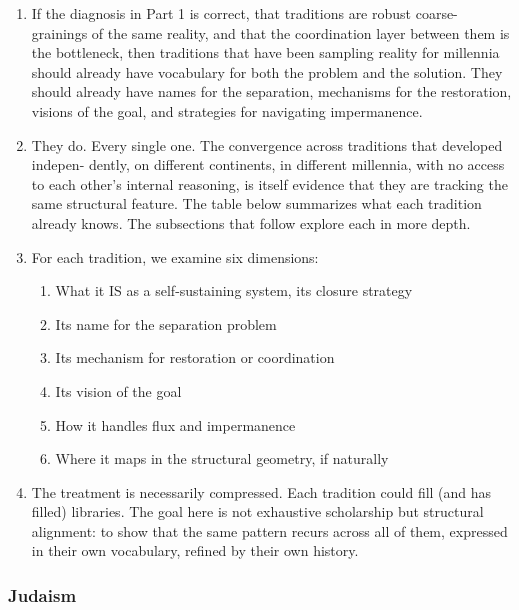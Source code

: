 \documentclass[
]{article}
\providecommand{\tightlist}{%
  \setlength{\itemsep}{0pt}\setlength{\parskip}{0pt}}
\begin{document}
\begin{enumerate}
\def\labelenumi{\arabic{enumi}.}
\setcounter{enumi}{12}
\tightlist
\item
  If the diagnosis in Part 1 is correct, that traditions are robust
  coarse-grainings of the same reality, and that the coordination layer
  between them is the bottleneck, then traditions that have been
  sampling reality for millennia should already have vocabulary for both
  the problem and the solution. They should already have names for the
  separation, mechanisms for the restoration, visions of the goal, and
  strategies for navigating impermanence.
\item
  They do. Every single one. The convergence across traditions that
  developed indepen- dently, on different continents, in different
  millennia, with no access to each other's internal reasoning, is
  itself evidence that they are tracking the same structural feature.
  The table below summarizes what each tradition already knows. The
  subsections that follow explore each in more depth.
\item
  For each tradition, we examine six dimensions:

  \begin{enumerate}
  \def\labelenumii{(\alph{enumii})}
  \tightlist
  \item
    What it IS as a self-sustaining system, its closure strategy
  \item
    Its name for the separation problem
  \item
    Its mechanism for restoration or coordination
  \item
    Its vision of the goal
  \item
    How it handles flux and impermanence
  \item
    Where it maps in the structural geometry, if naturally
  \end{enumerate}
\item
  The treatment is necessarily compressed. Each tradition could fill
  (and has filled) libraries. The goal here is not exhaustive
  scholarship but structural alignment: to show that the same pattern
  recurs across all of them, expressed in their own vocabulary, refined
  by their own history.
\end{enumerate}

\subsubsection{Judaism}\label{judaism}
\end{document}

